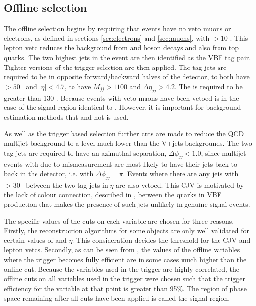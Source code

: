 \subsection{Offline selection}
\label{sec:promptofflinesel}
The offline selection begins by requiring that events have no veto muons or electrons, as defined in sections \ref{sec:electrons} and \ref{sec:muons}, with \pt$>10$ \GeV. This lepton veto reduces the background from \PW and \PZ boson decays and also from top quarks. The two highest \pt jets in the event are then identified as the VBF tag pair. Tighter versions of the trigger selection are then applied. The tag jets are required to be in opposite forward/backward halves of the detector, to both have \pt$>50$ \GeV\, and $|\eta|<4.7$, to have $M_{jj}>1100$ \GeV and $\Delta\eta_{jj}>4.2$. The \METnoMU is required to be greater than 130 \GeV. Because events with veto muons have been vetoed \METnoMU is in the case of the signal region identical to \MET. However, it is important for background estimation methods that \METnoMU and not \MET is used.

As well as the trigger based selection further cuts are made to reduce the \ac{QCD} multijet background to a level much lower than the V+jets backgrounds. The two tag jets are required to have an azimuthal separation, $\Delta\phi_{jj}<1.0$, since multijet events with \MET due to mismeasurement are most likely to have their jets back-to-back in the detector, i.e. with $\Delta\phi_{jj}=\pi$. Events where there are any jets with \pt$>30$ \GeV\, between the two tag jets in $\eta$ are also vetoed. This \ac{CJV} is motivated by the lack of colour connection, described in , between the quarks in VBF production that makes the presence of such jets unlikely in genuine signal events.

The specific values of the cuts on each variable are chosen for three reasons. Firstly, the reconstruction algorithms for some objects are only well validated for certain values of \pt and $\eta$. This consideration decides the threshold for the \ac{CJV} and lepton vetos. Secondly, as can be seen from , the values of the offline variables where the trigger becomes fully efficient are in some cases much higher than the online cut. Because the variables used in the trigger are highly correlated, the offline cuts on all variables used in the trigger were chosen such that the trigger efficiency for the variable at that point is greater than 95\%. The region of phase space remaining after all cuts have been applied is called the signal region.

